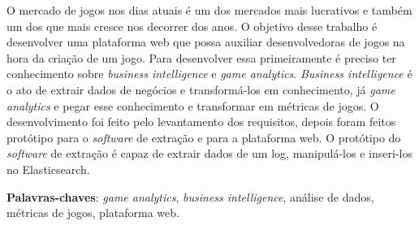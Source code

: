\begin{resumo}
O mercado de jogos nos dias atuais é um dos mercados mais lucrativos e também um dos que mais cresce nos decorrer dos anos. O objetivo desse trabalho é desenvolver uma plataforma web que possa auxiliar desenvolvedoras de jogos na hora da criação de um jogo. Para desenvolver essa primeiramente é preciso ter conhecimento sobre \textit{business intelligence} e \textit{game analytics}. \textit{Business intelligence} é o ato de extrair dados de negócios e transformá-los em conhecimento, já \textit{game analytics} e pegar esse conhecimento e transformar em métricas de jogos. O desenvolvimento foi feito pelo levantamento dos requisitos, depois foram feitos protótipo para o \textit{software} de extração e para a plataforma web. O protótipo do \textit{software} de extração é capaz de extrair dados de um log, manipulá-los e inseri-los no Elasticsearch.

\vspace{\onelineskip}
    
\noindent
\textbf{Palavras-chaves}: \textit{game analytics}, \textit{business intelligence}, análise de dados, métricas de jogos, plataforma web.
\end{resumo}
